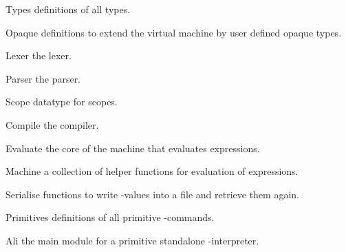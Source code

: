 \begin{description}
%
\item{\textsf{\red Types}}%
  definitions of all types.
\item{\textsf{\red Opaque}}%
  definitions to extend the virtual machine by user defined opaque types.
\item{\textsf{\red Lexer}}%
  the lexer.
\item{\textsf{\red Parser}}%
  the parser.
\item{\textsf{\red Scope}}%
  datatype for scopes.
\item{\textsf{\red Compile}}%
  the compiler.
\item{\textsf{\red Evaluate}}%
  the core of the machine that evaluates expressions.
\item{\textsf{\red Machine}}%
  a collection of helper functions for evaluation of expressions.
\item{\textsf{\red Serialise}}%
  functions to write \AL-values into a file and retrieve them again.
\item{\textsf{\red Primitives}}%
  definitions of all primitive \AL-commands.
\item{\textsf{\red Ali}}%
  the main module for a primitive standalone \AL-interpreter.
\end{description}


